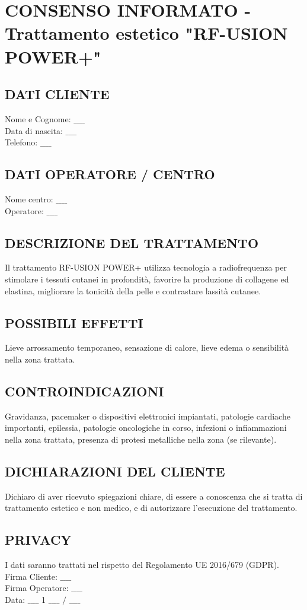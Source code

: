 
\newpage

\section{CONSENSO INFORMATO - Trattamento estetico "RF-USION POWER+"}
\subsection{DATI CLIENTE}
Nome e Cognome: $\_\_\_\_$\\
Data di nascita: $\_\_\_\_$\\
Telefono: $\_\_\_\_$

\subsection{DATI OPERATORE / CENTRO}
Nome centro: $\_\_\_\_$\\
Operatore: $\_\_\_\_$

\subsection{DESCRIZIONE DEL TRATTAMENTO}
Il trattamento RF-USION POWER+ utilizza tecnologia a radiofrequenza per stimolare i tessuti cutanei in profondità, favorire la produzione di collagene ed elastina, migliorare la tonicità della pelle e contrastare lassità cutanee.

\subsection{POSSIBILI EFFETTI}
Lieve arrossamento temporaneo, sensazione di calore, lieve edema o sensibilità nella zona trattata.

\subsection{CONTROINDICAZIONI}
Gravidanza, pacemaker o dispositivi elettronici impiantati, patologie cardiache importanti, epilessia, patologie oncologiche in corso, infezioni o infiammazioni nella zona trattata, presenza di protesi metalliche nella zona (se rilevante).

\subsection{DICHIARAZIONI DEL CLIENTE}
Dichiaro di aver ricevuto spiegazioni chiare, di essere a conoscenza che si tratta di trattamento estetico e non medico, e di autorizzare l'esecuzione del trattamento.

\subsection{PRIVACY}
I dati saranno trattati nel rispetto del Regolamento UE 2016/679 (GDPR).\\
Firma Cliente: $\_\_\_\_$\\
Firma Operatore: $\_\_\_\_$\\
Data: $\_\_\_\_$ 1 $\_\_\_\_$ $/$ $\_\_\_\_$